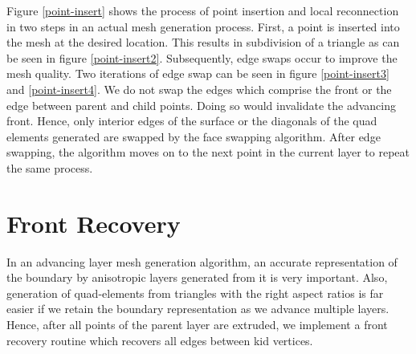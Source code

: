 Figure \ref{point-insert} shows the process of point insertion and local reconnection in two steps in an actual mesh generation process. First, a point is inserted into the mesh at the desired location. This results in subdivision of a triangle as can be seen in figure \ref{point-insert2}. Subsequently, edge swaps occur to improve the mesh quality. Two iterations of edge swap can be seen in figure \ref{point-insert3} and \ref{point-insert4}. We do not swap the edges which comprise the front or the edge between parent and child points. Doing so would invalidate the advancing front. Hence, only interior edges of the surface or the diagonals of the quad elements generated are swapped by the face swapping algorithm. After edge swapping, the algorithm moves on to the next point in the current layer to repeat the same process.


\section{Front Recovery}


In an advancing layer mesh generation algorithm, an accurate representation of the boundary by anisotropic layers generated from it is very important. Also, generation of quad-elements from triangles with the right aspect ratios is far easier if we retain the boundary representation as we advance multiple layers. Hence, after all points of the parent layer are extruded, we implement a front recovery routine which recovers all edges between kid vertices.

